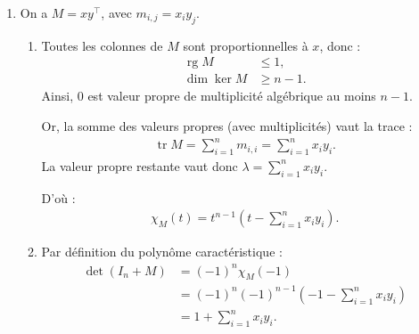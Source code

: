 \documentclass[12pt, a4paper]{article}
\newcommand{\rg}{\operatorname{rg}}
\newcommand{\tr}{\operatorname{tr}}
\begin{document}
\begin{enumerate}
    \pagebreak
  \item On a $M=xy^\top$, avec
    $m_{i,j}=x_i y_j$.

    \begin{enumerate}
      \item Toutes les colonnes de $M$ sont
      proportionnelles à $x$, donc :
      \begin{align*}
        \rg M&\le1,\\
        \dim\ker M&\ge n-1.
      \end{align*}
      Ainsi, $0$ est valeur propre de multiplicité
      algébrique au moins $n-1$.

      Or, la somme des valeurs propres
      (avec multiplicités) vaut la trace :
      \begin{align*}
        \tr M=\sum_{i=1}^n m_{i,i}
        =\sum_{i=1}^n x_i y_i.
      \end{align*}
      La valeur propre restante vaut donc
      $\lambda=\sum_{i=1}^n x_i y_i$.

      D'où :
      \begin{align*}
        \boxed{
          \chi_M(t)=t^{n-1}
          \left(t-\sum_{i=1}^n x_i y_i\right)
        }.
      \end{align*}

      \item Par définition du polynôme
      caractéristique :
      \begin{align*}
        \det(I_n+M)
        &=(-1)^n\chi_M(-1)\\
        &=(-1)^n(-1)^{n-1}
          \left(-1-\sum_{i=1}^n x_i y_i\right)\\
        &=\boxed{1+\sum_{i=1}^n x_i y_i}.
      \end{align*}
    \end{enumerate}
\end{enumerate}
\end{document}
